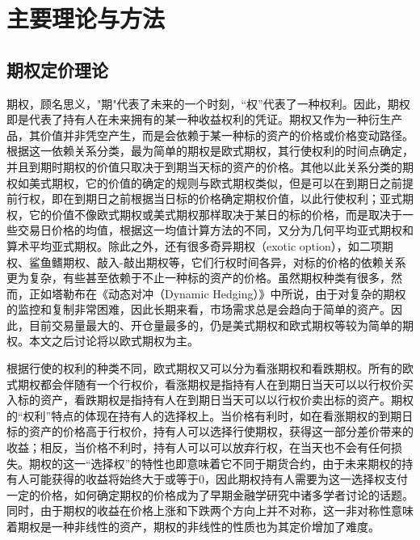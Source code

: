 
\chapter{主要理论与方法}
\label{chap:theory}

\section{期权定价理论}

期权，顾名思义，"期"代表了未来的一个时刻，“权”代表了一种权利。因此，期权即是代表了持有人在未来拥有的某一种收益权利的凭证。期权又作为一种衍生产品，其价值并非凭空产生，而是会依赖于某一种标的资产的价格或价格变动路径。根据这一依赖关系分类，最为简单的期权是欧式期权，其行使权利的时间点确定，并且到期时期权的价值只取决于到期当天标的资产的价格。其他以此关系分类的期权如美式期权，它的价值的确定的规则与欧式期权类似，但是可以在到期日之前提前行权，即在到期日之前根据当日标的价格确定期权价值，以此行使权利；亚式期权，它的价值不像欧式期权或美式期权那样取决于某日的标的价格，而是取决于一些交易日价格的均值，根据这一均值计算方法的不同，又分为几何平均亚式期权和算术平均亚式期权。除此之外，还有很多奇异期权（exotic option），如二项期权、鲨鱼鳍期权、敲入-敲出期权等，它们行权时间各异，对标的价格的依赖关系更为复杂，有些甚至依赖于不止一种标的资产的价格。虽然期权种类有很多，然而，正如塔勒布\cite{taleb1997dynamic}在《动态对冲（Dynamic Hedging）》中所说，由于对复杂的期权的监控和复制非常困难，因此长期来看，市场需求总是会趋向于简单的资产。因此，目前交易量最大的、开仓量最多的，仍是美式期权和欧式期权等较为简单的期权。本文之后讨论将以欧式期权为主。

根据行使的权利的种类不同，欧式期权又可以分为看涨期权和看跌期权。所有的欧式期权都会伴随有一个行权价，看涨期权是指持有人在到期日当天可以以行权价买入标的资产，看跌期权是指持有人在到期日当天可以以行权价卖出标的资产。期权的“权利”特点的体现在持有人的选择权上。当价格有利时，如在看涨期权的到期日标的资产的价格高于行权价，持有人可以选择行使期权，获得这一部分差价带来的收益；相反，当价格不利时，持有人可以可以放弃行权，在当天也不会有任何损失。期权的这一“选择权”的特性也即意味着它不同于期货合约，由于未来期权的持有人可能获得的收益将始终大于或等于0，因此期权持有人需要为这一选择权支付一定的价格，如何确定期权的价格成为了早期金融学研究中诸多学者讨论的话题。同时，由于期权的收益在价格上涨和下跌两个方向上并不对称，这一非对称性意味着期权是一种非线性的资产，期权的非线性的性质也为其定价增加了难度。

